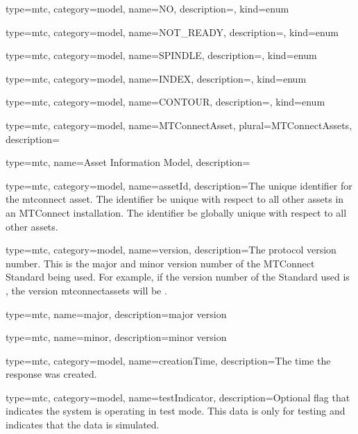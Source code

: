 {
  type=mtc,
  category=model,
  name={NO},
  description={},
  kind={enum}
}


{
  type=mtc,
  category=model,
  name={NOT\_READY},
  description={},
  kind={enum}
}


{
  type=mtc,
  category=model,
  name={SPINDLE},
  description={},
  kind={enum}
}


{
  type=mtc,
  category=model,
  name={INDEX},
  description={},
  kind={enum}
}


{
  type=mtc,
  category=model,
  name={CONTOUR},
  description={},
  kind={enum}
}


{
  type=mtc,
  category=model,
  name={MTConnectAsset},
  plural={MTConnectAssets},
  description={}
}


{
  type=mtc,
  name={Asset Information Model},
  description={}
}


{
  type=mtc,
  category=model,
  name={assetId},
  description={The unique identifier for the \gls{mtconnect asset}. The identifier \MUST be unique with respect to all other \glspl{asset} in an MTConnect installation. The identifier \SHOULD be globally unique with respect to all other \glspl{asset}.}
}


{
  type=mtc,
  category=model,
  name={version},
  description={The protocol version number. This is the \gls{major} and \gls{minor} version number of the MTConnect Standard being used. For example, if the version number of the Standard used is , the \gls{version mtconnectassets} will be .}
}


{
  type=mtc,
  name={major},
  description={major version}
}


{
  type=mtc,
  name={minor},
  description={minor version}
}


{
  type=mtc,
  category=model,
  name={creationTime},
  description={The time the response was created. }
}


{
  type=mtc,
  category=model,
  name={testIndicator},
  description={Optional flag that indicates the system is operating in test mode. This data is only for testing and indicates that the data is simulated. }
}


